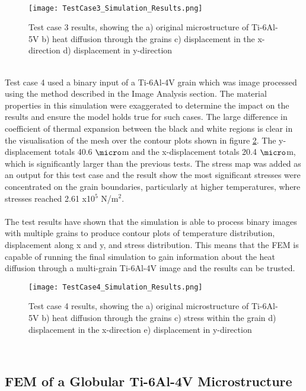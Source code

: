 \documentclass[report.tex]{subfiles}
\begin{document}
\\
\begin{figure}[htp]
    \centering
    \texttt{[image: TestCase3\_Simulation\_Results.png]}
    \caption{Test case 3 results, showing the a) original microstructure of Ti-6Al-5V b) heat diffusion through the grains c) displacement in the x-direction d) displacement in y-direction}
    \label{fig:TestCase3Results}
\end{figure}
\\
Test case 4 used a binary input of a Ti-6Al-4V grain which was image processed using the method described in the Image Analysis section. The material properties in this simulation were exaggerated to determine the impact on the results and ensure the model holds true for such cases. The large difference in coefficient of thermal expansion between the black and white regions is clear in the visualisation of the mesh over the contour plots shown in figure \ref{fig:TestCase4Results}. The y-displacement totals 40.6 $\micro$m and the x-displacement totals 20.4 $\micro$m, which is significantly larger than the previous tests. The stress map was added as an output for this test case and the result show the most significant stresses were concentrated on the grain boundaries, particularly at higher temperatures, where stresses reached 2.61 x10$^5$ N/m$^2$.\\
\\
The test results have shown that the simulation is able to process binary images with multiple grains to produce contour plots of temperature distribution, displacement along x and y, and stress distribution. This means that the FEM is capable of running the final simulation to gain information about the heat diffusion through a multi-grain Ti-6Al-4V image and the results can be trusted.
\\
\begin{figure}[htp]
    \centering
    \texttt{[image: TestCase4\_Simulation\_Results.png]}
    \caption{Test case 4 results, showing the a) original microstructure of Ti-6Al-5V b) heat diffusion through the grains c) stress within the grain d) displacement in the x-direction e) displacement in y-direction}
    \label{fig:TestCase4Results}
\end{figure}
\\

\subsection{FEM of a Globular Ti-6Al-4V Microstructure}
\end{document}
